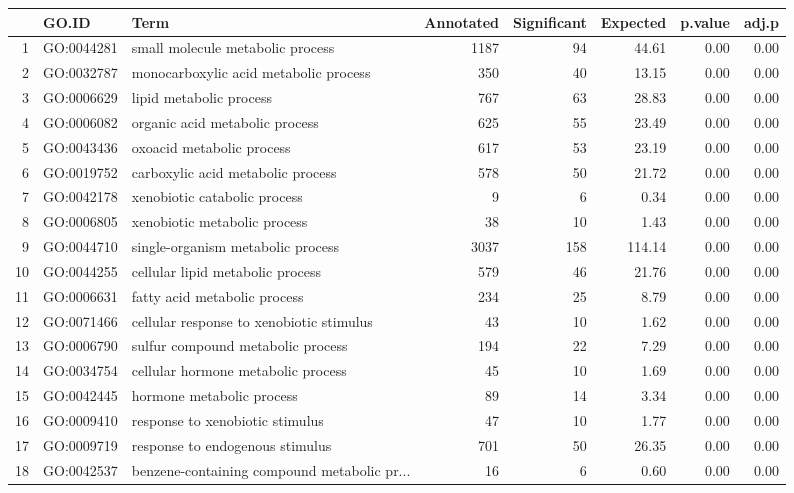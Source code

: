 \begin{table}[ht]
\centering
\begin{tabular}{rllrrrrr}
  \hline
 & GO.ID & Term & Annotated & Significant & Expected & p.value & adj.p \\ 
  \hline
1 & GO:0044281 & small molecule metabolic process & 1187 &  94 & 44.61 & 0.00 & 0.00 \\ 
  2 & GO:0032787 & monocarboxylic acid metabolic process & 350 &  40 & 13.15 & 0.00 & 0.00 \\ 
  3 & GO:0006629 & lipid metabolic process & 767 &  63 & 28.83 & 0.00 & 0.00 \\ 
  4 & GO:0006082 & organic acid metabolic process & 625 &  55 & 23.49 & 0.00 & 0.00 \\ 
  5 & GO:0043436 & oxoacid metabolic process & 617 &  53 & 23.19 & 0.00 & 0.00 \\ 
  6 & GO:0019752 & carboxylic acid metabolic process & 578 &  50 & 21.72 & 0.00 & 0.00 \\ 
  7 & GO:0042178 & xenobiotic catabolic process &   9 &   6 & 0.34 & 0.00 & 0.00 \\ 
  8 & GO:0006805 & xenobiotic metabolic process &  38 &  10 & 1.43 & 0.00 & 0.00 \\ 
  9 & GO:0044710 & single-organism metabolic process & 3037 & 158 & 114.14 & 0.00 & 0.00 \\ 
  10 & GO:0044255 & cellular lipid metabolic process & 579 &  46 & 21.76 & 0.00 & 0.00 \\ 
  11 & GO:0006631 & fatty acid metabolic process & 234 &  25 & 8.79 & 0.00 & 0.00 \\ 
  12 & GO:0071466 & cellular response to xenobiotic stimulus &  43 &  10 & 1.62 & 0.00 & 0.00 \\ 
  13 & GO:0006790 & sulfur compound metabolic process & 194 &  22 & 7.29 & 0.00 & 0.00 \\ 
  14 & GO:0034754 & cellular hormone metabolic process &  45 &  10 & 1.69 & 0.00 & 0.00 \\ 
  15 & GO:0042445 & hormone metabolic process &  89 &  14 & 3.34 & 0.00 & 0.00 \\ 
  16 & GO:0009410 & response to xenobiotic stimulus &  47 &  10 & 1.77 & 0.00 & 0.00 \\ 
  17 & GO:0009719 & response to endogenous stimulus & 701 &  50 & 26.35 & 0.00 & 0.00 \\ 
  18 & GO:0042537 & benzene-containing compound metabolic pr... &  16 &   6 & 0.60 & 0.00 & 0.00 \\ 

\end{tabular}
\end{table}
